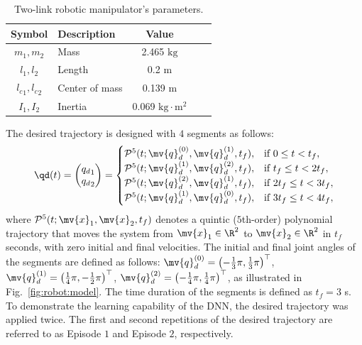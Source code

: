 \documentclass[letterpaper, journal]{IEEEtran}
\begin{document}
\begin{table}[t]
    \renewcommand{\arraystretch}{1.3}
    \caption{Two-link robotic manipulator's parameters.}
    \centering
    \begin{tabular}{c m{9.5em} c c c }
    \hline
    \textbf{Symbol} & \textbf{Description} & \textbf{Value} \\
    \hline
    \hline 
    $m_1,m_2$ & Mass & 2.465 $\mathrm{kg}$ \\
    \hline
    $l_1,l_2$  & Length & 0.2 $\mathrm{m}$ \\  
    \hline
    ${l_c}_1,{l_c}_2$ & Center of mass & 0.139 $\mathrm{m}$ \\
    \hline
    $I_1,I_2$  & Inertia & 0.069 $\mathrm{kg\cdot m^{2}}$ \\
    \hline
    \end{tabular}
    \label{table:system:params}
\end{table}

The desired trajectory is designed with $4$ segments as follows:
\begin{equation}
    \qd(t) 
    =
    \begin{pmatrix}
        {q_d}_1
        \\
        {q_d}_2
    \end{pmatrix}
    =
    \begin{cases}
    \mathcal{P}^5(t;\mv{q}_d^{(0)},\mv{q}_d^{(1)},t_f),
        &
        \text{if } 0 \le t < t_f 
        ,
        \\
    \mathcal{P}^5(t;\mv{q}_d^{(1)},\mv{q}_d^{(2)},t_f),
        &
        \text{if } t_f \le t < 2t_f 
        ,
        \\
    \mathcal{P}^5(t;\mv{q}_d^{(2)},\mv{q}_d^{(1)},t_f),
        & 
        \text{if } 2t_f \le t < 3t_f 
        ,
        \\
    \mathcal{P}^5(t;\mv{q}_d^{(1)},\mv{q}_d^{(0)},t_f),
        &    
        \text{if } 3t_f \le t < 4t_f 
        ,
        \\
    \end{cases} 
    \label{eq:desired trajectory}
\end{equation}
where $\mathcal{P}^5(t;\mv{x}_1,\mv{x}_2,t_f)$ denotes a quintic ($5$th-order) polynomial trajectory that moves the system from $\mv{x}_1\in\R^2$ to $\mv{x}_2\in\R^2$ in $t_f$ seconds, with zero initial and final velocities.
The initial and final joint angles of the segments are defined as follows:
$
    \mv{q}_d^{(0)}=\left(-\tfrac{1}{3}\pi,\tfrac{1}{3}\pi\right)^\top
$, 
$
    \mv{q}_d^{(1)}=\left(\tfrac{1}{4}\pi,-\tfrac{1}{2}\pi\right)^\top
$, 
$
    \mv{q}_d^{(2)}=\left(-\tfrac{1}{4}\pi,\tfrac{1}{4}\pi\right)^\top
$, as illustrated in Fig.~\ref{fig:robot:model}.
The time duration of the segments is defined as $t_f=3$ s.
To demonstrate the learning capability of the DNN, the desired trajectory was applied twice. 
The first and second repetitions of the desired trajectory are referred to as Episode $1$ and Episode $2$, respectively.
\end{document}
